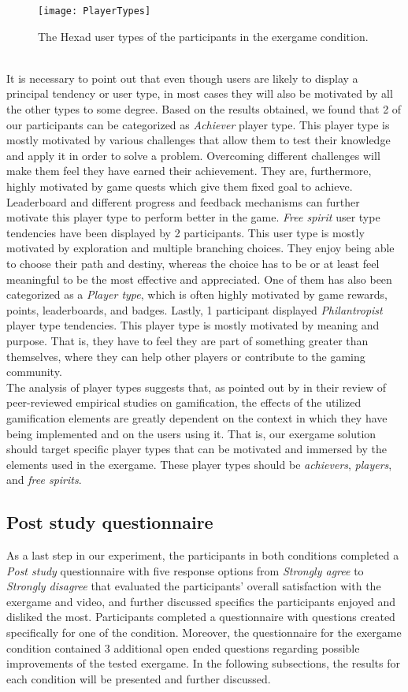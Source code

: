 \begin{figure}[h]
    \centering
    \texttt{[image: PlayerTypes]}
    \caption{The Hexad user types of the participants in the exergame condition.}
    \label{fig:playerTypes}
\end{figure}\\ It is necessary to point out that even though users are likely to display a principal tendency or user type, in most cases they will also be motivated by all the other types to some degree. Based on the results obtained, we found that 2  of our participants can be categorized as \textit{Achiever} player type. This player type is mostly motivated by various challenges that allow them to test their knowledge and apply it in order to solve a problem. Overcoming different challenges will make them feel they have earned their achievement. They are, furthermore, highly motivated by game quests which give them fixed goal to achieve. Leaderboard and different progress and feedback mechanisms can further motivate this player type to perform better in the game. \textit{Free spirit} user type tendencies have been displayed by 2 participants. This user type is mostly motivated by exploration and multiple branching choices. They enjoy being able to choose their path and destiny, whereas the choice has to be or at least feel meaningful to be the most effective and appreciated. One of them has also been categorized as a \textit{Player type}, which is often highly motivated by game rewards, points, leaderboards, and badges. Lastly, 1 participant displayed \textit{Philantropist} player type tendencies. This player type is mostly motivated by meaning and purpose. That is, they have to feel they are part of something greater than themselves, where they can help other players or contribute to the gaming community. \\ 
The analysis of player types suggests that, as pointed out by \cite{hamari2014does} in their review of peer-reviewed empirical studies on gamification, the effects of the utilized gamification elements are greatly dependent on the context in which they have being implemented and on the users using it. That is, our exergame solution should target specific player types that can be motivated and immersed by the elements used in the exergame. These player types should be \textit{achievers}, \textit{players}, and \textit{free spirits}.
\subsection{Post study questionnaire}
As a last step in our experiment, the participants in both conditions completed  a \textit{Post study} questionnaire with five response options from \textit{Strongly agree} to \textit{Strongly disagree} that evaluated the participants' overall satisfaction with the exergame and video, and further discussed specifics the participants enjoyed and disliked the most. Participants completed a questionnaire with questions created specifically for one of the condition. Moreover, the questionnaire for the exergame condition contained 3 additional open ended questions regarding possible improvements of the tested exergame. In the following subsections, the results for each condition will be presented and further discussed.
